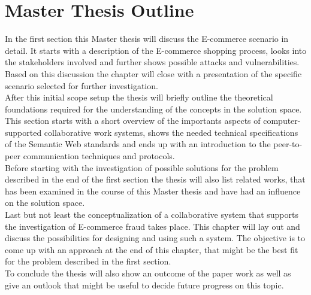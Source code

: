 
\section{Master Thesis Outline}
\label{sec:thesis_outline}

In the first section this Master thesis will discuss the E-commerce scenario in detail. It starts with a description of the E-commerce shopping process, looks into the stakeholders involved and further shows possible attacks and vulnerabilities. Based on this discussion the chapter will close with a presentation of the specific scenario selected for further investigation. \\

After this initial scope setup the thesis will briefly outline the theoretical foundations required for the understanding of the concepts in the solution space. This section starts with a short overview of the importants aspects of computer-supported collaborative work systems, shows the needed technical specifications of the Semantic Web standards and ends up with an introduction to the peer-to-peer communication techniques and protocols. \\

Before starting with the investigation of possible solutions for the problem described in the end of the first section the thesis will also list related works, that has been examined in the course of this Master thesis and have had an influence on the solution space. \\

Last but not least the conceptualization of a collaborative system that supports the investigation of E-commerce fraud takes place. This chapter will lay out and discuss the possibilities for designing and using such a system. The objective is to come up with an approach at the end of this chapter, that might be the best fit for the problem described in the first section. \\

To conclude the thesis will also show an outcome of the paper work as well as give an outlook that might be useful to decide future progress on this topic.

